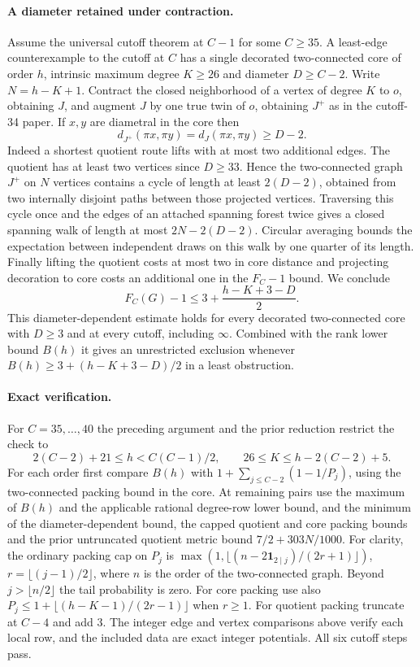 \documentclass[11pt,a4paper]{article}
\begin{document}
\paragraph{A diameter retained under contraction.}
Assume the universal cutoff theorem at $C-1$ for some $C\ge35$.
A least-edge counterexample to the cutoff at $C$ has a single decorated two-connected core of order $h$, intrinsic maximum degree $K\ge26$ and diameter $D\ge C-2$. Write $N=h-K+1$. Contract the closed neighborhood of a vertex of degree $K$ to $o$, obtaining $J$, and augment $J$ by one true twin of $o$, obtaining $J^+$ as in the cutoff-34 paper. If $x,y$ are diametral in the core then
\[
 d_{J^+}(\pi x,\pi y)=d_J(\pi x,\pi y)\ge D-2.
\]
Indeed a shortest quotient route lifts with at most two additional edges. The quotient has at least two vertices since $D\ge33$. Hence the two-connected graph $J^+$ on $N$ vertices contains a cycle of length at least $2(D-2)$, obtained from two internally disjoint paths between those projected vertices. Traversing this cycle once and the edges of an attached spanning forest twice gives a closed spanning walk of length at most $2N-2(D-2)$. Circular averaging bounds the expectation between independent draws on this walk by one quarter of its length. Finally lifting the quotient costs at most two in core distance and projecting decoration to core costs an additional one in the $F_C-1$ bound. We conclude
\[
 F_C(G)-1\le 3+\frac{h-K+3-D}{2}.
\]
This diameter-dependent estimate holds for every decorated two-connected core with $D\ge3$ and at every cutoff, including $\infty$. Combined with the rank lower bound $B(h)$ it gives an unrestricted exclusion whenever $B(h)\ge3+(h-K+3-D)/2$ in a least obstruction.

\paragraph{Exact verification.}
For $C=35,\ldots,40$ the preceding argument and the prior reduction restrict the check to
\[
 2(C-2)+21\le h<C(C-1)/2,\qquad 26\le K\le h-2(C-2)+5.
\]
For each order first compare $B(h)$ with $1+\sum_{j\le C-2}(1-1/P_j)$, using the two-connected packing bound in the core. At remaining pairs use the maximum of $B(h)$ and the applicable rational degree-row lower bound, and the minimum of the diameter-dependent bound, the capped quotient and core packing bounds and the prior untruncated quotient metric bound $7/2+303N/1000$. For clarity, the ordinary packing cap on $P_j$ is $\max(1,\lfloor(n-2\mathbf1_{2\mid j})/(2r+1)\rfloor)$, $r=\lfloor(j-1)/2\rfloor$, where $n$ is the order of the two-connected graph. Beyond $j>\lfloor n/2\rfloor$ the tail probability is zero. For core packing use also $P_j\le1+\lfloor(h-K-1)/(2r-1)\rfloor$ when $r\ge1$. For quotient packing truncate at $C-4$ and add $3$. The integer edge and vertex comparisons above verify each local row, and the included data are exact integer potentials. All six cutoff steps pass.
\end{document}
